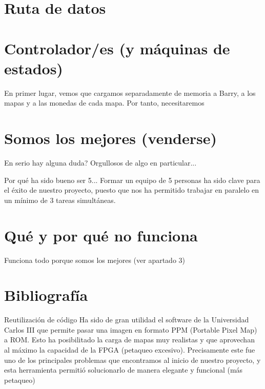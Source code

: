 \documentclass[11pt, a4paper, spanish, openright, twoside]{book}
\begin{document}
\newpage
\mbox{}
\thispagestyle{empty}						%
\newpage


\tableofcontents 							%

\newpage
\mbox{}
\thispagestyle{empty}						%
\newpage


\vspace{3cm}


\section{Ruta de datos}


\section{Controlador/es (y máquinas de estados)}
En primer lugar, vemos que cargamos separadamente de memoria a Barry, a los mapas y a las monedas de cada mapa.
Por tanto, necesitaremos


\section{Somos los mejores (venderse)}
En serio hay alguna duda?
Orgullosos de algo en particular...

Por qué ha sido bueno ser 5...
Formar un equipo de 5 personas ha sido clave para el éxito de nuestro proyecto, puesto que nos ha permitido trabajar en paralelo en un mínimo de 3 tareas simultáneas. 

\section{Qué y por qué no funciona}
Funciona todo porque somos los mejores (ver apartado 3)



\section{Bibliografía}
Reutilización de código
Ha sido de gran utilidad el software de la Universidad Carlos III que permite pasar una imagen en formato PPM (Portable Pixel Map) a ROM. Esto ha posibilitado la carga de mapas muy realistas y que aprovechan al máximo la capacidad de la FPGA (petaqueo excesivo).
Precisamente este fue uno de los principales problemas que encontramos al inicio de nuestro proyecto, y esta herramienta permitió solucionarlo de manera elegante y funcional (más petaqueo)
\end{document}

